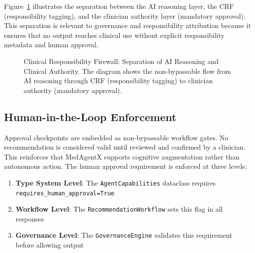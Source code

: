 \documentclass[journal]{IEEEtran}
\begin{document}
Figure~\ref{fig:crf} illustrates the separation between the AI reasoning layer, the CRF (responsibility tagging), and the clinician authority layer (mandatory approval). This separation is relevant to governance and responsibility attribution because it ensures that no output reaches clinical use without explicit responsibility metadata and human approval.
\begin{figure}[H]
\centering
{}
\caption{Clinical Responsibility Firewall: Separation of AI Reasoning and Clinical Authority. The diagram shows the non-bypassable flow from AI reasoning through CRF (responsibility tagging) to clinician authority (mandatory approval).}
\label{fig:crf}
\end{figure}

\subsection{Human-in-the-Loop Enforcement}
Approval checkpoints are embedded as non-bypassable workflow gates. No recommendation is considered valid until reviewed and confirmed by a clinician. This reinforces that MedAgentX supports cognitive augmentation rather than autonomous action. The human approval requirement is enforced at three levels:

\begin{enumerate}
    \item \textbf{Type System Level}: The \texttt{AgentCapabilities} dataclass requires \texttt{requires\_human\_approval=True}
    \item \textbf{Workflow Level}: The \texttt{RecommendationWorkflow} sets this flag in all responses
    \item \textbf{Governance Level}: The \texttt{GovernanceEngine} validates this requirement before allowing output
\end{enumerate}

\newpage
\end{document}
